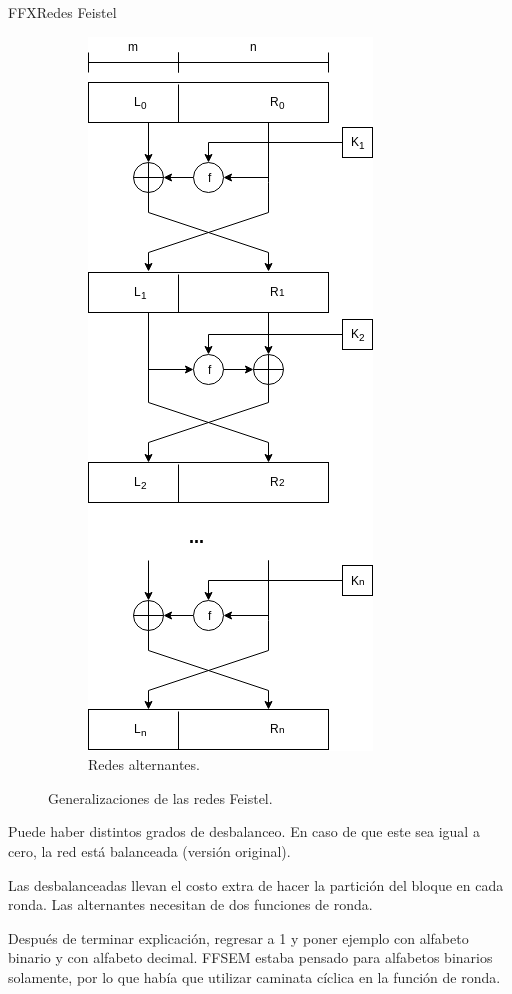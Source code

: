\begin{frame}{FFX}{Redes Feistel}
{\begin{figure}[H]
\begin{subfigure}{0.45\textwidth}
\begin{center}
          \includegraphics[height=0.65\textheight]
            {../../../diagramas_comunes/redes_feistel/alternantes.png}
          \caption{Redes alternantes.}
        \end{center}
      \end{subfigure}
      \caption{Generalizaciones de las redes Feistel.}
    \end{figure}
  }

  {
    Puede haber distintos grados de desbalanceo. En caso de que este sea igual
    a cero, la red está balanceada (versión original).

    Las desbalanceadas llevan el costo extra de hacer la partición del bloque
    en cada ronda. Las alternantes necesitan de dos funciones de ronda.

    Después de terminar explicación, regresar a 1 y poner ejemplo con
    alfabeto binario y con alfabeto decimal. FFSEM estaba pensado para
    alfabetos binarios solamente, por lo que había que utilizar caminata
    cíclica en la función de ronda.
  }

\end{frame}

